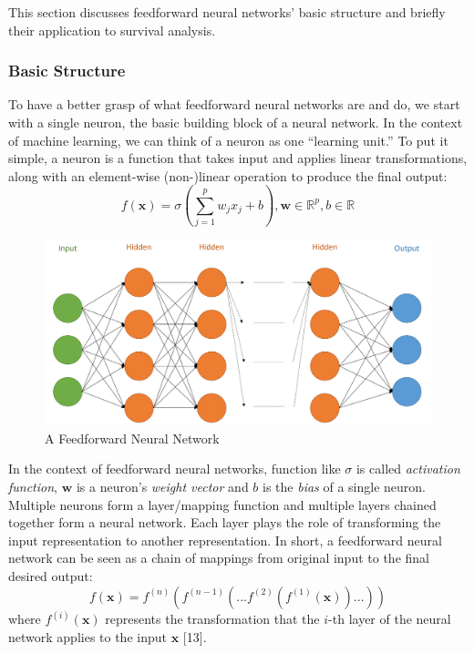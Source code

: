\documentclass[
]{article}
\begin{document}
This section discusses feedforward neural networks' basic structure and briefly their application to survival analysis.

\hypertarget{basic-structure}{%
\subsubsection{Basic Structure}\label{basic-structure}}

To have a better grasp of what feedforward neural networks are and do, we start with a single neuron, the basic building block of a neural network. In the context of machine learning, we can think of a neuron as one ``learning unit.'' To put it simple, a neuron is a function that takes input and applies linear transformations, along with an element-wise (non-)linear operation to produce the final output:
\[f(\mathbf{x}) = \sigma (\sum_{j=1}^{p}w_j x_j + b), \mathbf{w} \in \mathbb{R}^p , b \in \mathbb{R}\]

\begin{figure}

{\centering \includegraphics[width=0.7\linewidth]{deep-feedforward-neural-network} 

}

\caption{A Feedforward Neural Network}\label{fig:feedforward-neural-network}
\end{figure}

In the context of feedforward neural networks, function like \(\sigma\) is called \emph{activation function}, \(\mathbf{w}\) is a neuron's \emph{weight vector} and \(b\) is the \emph{bias} of a single neuron. Multiple neurons form a layer/mapping function and multiple layers chained together form a neural network. Each layer plays the role of transforming the input representation to another representation. In short, a feedforward neural network can be seen as a chain of mappings from original input to the final desired output:
\[f(\mathbf{x}) = f^{(n)}(f^{(n-1)}(...f^{(2)}(f^{(1)}(\mathbf{x}))...))\]
where \(f^{(i)}(\mathbf{x})\) represents the transformation that the \(i\)-th layer of the neural network applies to the input \(\mathbf{x}\) {[}13{]}.
\end{document}
